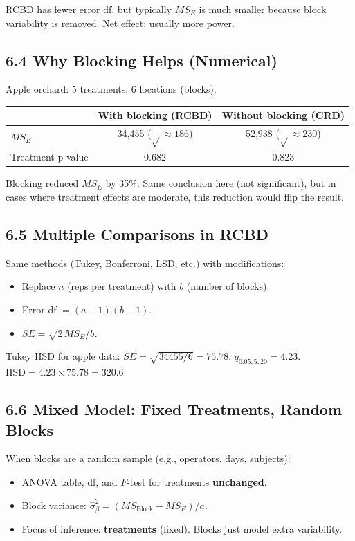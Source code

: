 \documentclass[9pt,letterpaper]{article}
\begin{document}
RCBD has fewer error df, but typically $MS_E$ is much smaller because block variability is removed. Net effect: usually more power.

\subsection{6.4 Why Blocking Helps (Numerical)}

Apple orchard: 5 treatments, 6 locations (blocks).

\begin{center}\small
\begin{tabular}{@{}lcc@{}}
\toprule
 & With blocking (RCBD) & Without blocking (CRD) \\
\midrule
$MS_E$ & 34,455 ($\sqrt{}\approx 186$) & 52,938 ($\sqrt{}\approx 230$) \\
Treatment p-value & 0.682 & 0.823 \\
\bottomrule
\end{tabular}
\end{center}

Blocking reduced $MS_E$ by 35\%. Same conclusion here (not significant), but in cases where treatment effects are moderate, this reduction would flip the result.

\subsection{6.5 Multiple Comparisons in RCBD}

Same methods (Tukey, Bonferroni, LSD, etc.) with modifications:
\begin{itemize}
    \item Replace $n$ (reps per treatment) with $b$ (number of blocks).
    \item Error df $= (a-1)(b-1)$.
    \item $SE = \sqrt{2\,MS_E/b}$.
\end{itemize}

Tukey HSD for apple data: $SE = \sqrt{34455/6} = 75.78$. $q_{0.05,5,20} = 4.23$. $\text{HSD} = 4.23 \times 75.78 = 320.6$.

\subsection{6.6 Mixed Model: Fixed Treatments, Random Blocks}

When blocks are a random sample (e.g., operators, days, subjects):
\begin{itemize}
    \item ANOVA table, df, and $F$-test for treatments \textbf{unchanged}.
    \item Block variance: $\hat\sigma_\beta^2 = (MS_{\text{Block}} - MS_E)/a$.
    \item Focus of inference: \textbf{treatments} (fixed). Blocks just model extra variability.
\end{itemize}
\end{document}

